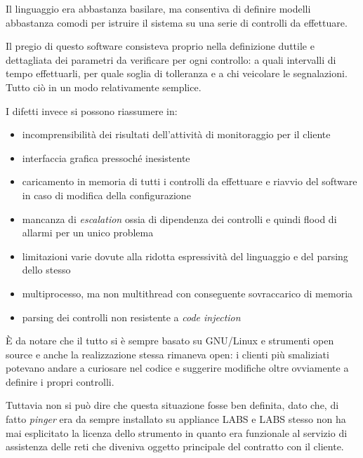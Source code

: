 \documentclass[a4wide,10pt,italian]{manual}
\begin{document}
Il linguaggio era abbastanza basilare, ma consentiva di definire modelli abbastanza comodi
per istruire il sistema su una serie di controlli da effettuare.

Il pregio di questo software consisteva proprio nella definizione duttile e dettagliata dei parametri
da verificare per ogni controllo: a quali intervalli di tempo effettuarli,
per quale soglia di tolleranza e a chi veicolare le segnalazioni.
Tutto ciò in un modo relativamente semplice.

I difetti invece si possono riassumere in:
\begin{itemize}
\item {} 
incomprensibilità dei risultati dell'attività di monitoraggio per il cliente

\item {} 
interfaccia grafica pressoché inesistente

\item {} 
caricamento in memoria di tutti i controlli da effettuare e riavvio del software in caso di modifica della configurazione

\item {} 
mancanza di \emph{escalation} ossia di dipendenza dei controlli e quindi flood di allarmi per un unico problema

\item {} 
limitazioni varie dovute alla ridotta espressività del linguaggio e del parsing dello stesso

\item {} 
multiprocesso, ma non multithread con conseguente sovraccarico di memoria

\item {} 
parsing dei controlli non resistente a \emph{code injection}

\end{itemize}

È da notare che il tutto si è sempre basato su GNU/Linux e strumenti open source
e anche la realizzazione stessa rimaneva open: i clienti più smaliziati potevano
andare a curiosare nel codice e suggerire modifiche oltre ovviamente a definire i propri controlli.

Tuttavia non si può dire che questa situazione fosse ben definita, dato che, di fatto \emph{pinger} era da sempre
installato su appliance LABS e LABS stesso non ha mai esplicitato la licenza dello strumento in quanto
era funzionale al servizio di assistenza delle reti che diveniva oggetto principale del contratto con il cliente.
\end{document}
